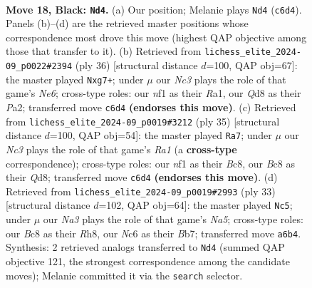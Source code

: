 \documentclass[11pt]{article}
\begin{document}
\begin{figure}[p]
\label{fig:thought-m33}
\end{figure}

\clearpage

\begin{figure}[p]\centering
\begin{subfigure}{0.46\textwidth}\centering
\resizebox{\linewidth}{!}{%
\newchessgame
\chessboard[
  setfen={r1bq1k2/pp3pp1/n1n1p3/1Q1pP3/5P1r/PP6/6PP/R3KNNR b KQ - 0 18},
  showmover=false,
  pgfstyle=straightmove, color=movearrow, markmove={c6-d4}
]}
\caption{}
\end{subfigure}\hfill
\begin{subfigure}{0.46\textwidth}\centering
\resizebox{\linewidth}{!}{%
\newchessgame
\chessboard[
  setfen={1r2k2r/3qp1bp/ppn1N3/2p2p2/4N3/1QPP4/PP4PP/R1B3K1 w k - 0 19},
  showmover=false,
  pgfstyle=straightmove, color=movearrow, markmove={e6-g7}
]}
\caption{}
\end{subfigure}
\\[4pt]
\begin{subfigure}{0.46\textwidth}\centering
\resizebox{\linewidth}{!}{%
\newchessgame
\chessboard[
  setfen={r1bqr1k1/5pp1/pp1p3p/2n5/P1PQP3/R4N1P/5PP1/2B1R1K1 b - - 0 18},
  showmover=false,
  pgfstyle=straightmove, color=movearrow, markmove={a8-a7}
]}
\caption{}
\end{subfigure}\hfill
\begin{subfigure}{0.46\textwidth}\centering
\resizebox{\linewidth}{!}{%
\newchessgame
\chessboard[
  setfen={4k2r/1bq1bppp/p2ppn2/8/nQpNP1P1/4BP2/P1P4P/K2R1B1R b k - 1 17},
  showmover=false,
  pgfstyle=straightmove, color=movearrow, markmove={a4-c5}
]}
\caption{}
\end{subfigure}
\caption{\textbf{Move 18, Black: \texttt{Nd4}.} (a) Our position; Melanie plays \texttt{Nd4} (\texttt{c6d4}). Panels (b)--(d) are the retrieved master positions whose correspondence most drove this move (highest QAP objective among those that transfer to it). (b) Retrieved from \texttt{lichess\_elite\_2024-09\_p0022\#2394} (ply 36) [structural distance $d$=100, QAP obj=67]: the master played \texttt{Nxg7+}; under $\mu$ our \emph{Nc3} plays the role of that game's \emph{Ne6}; cross-type roles: our \emph{n}f1 as their \emph{R}a1, our \emph{Q}d8 as their \emph{P}a2; transferred move \texttt{c6d4} \textbf{(endorses this move)}. (c) Retrieved from \texttt{lichess\_elite\_2024-09\_p0019\#3212} (ply 35) [structural distance $d$=100, QAP obj=54]: the master played \texttt{Ra7}; under $\mu$ our \emph{Nc3} plays the role of that game's \emph{Ra1} (a \textbf{cross-type} correspondence); cross-type roles: our \emph{n}f1 as their \emph{B}c8, our \emph{B}c8 as their \emph{Q}d8; transferred move \texttt{c6d4} \textbf{(endorses this move)}. (d) Retrieved from \texttt{lichess\_elite\_2024-09\_p0019\#2993} (ply 33) [structural distance $d$=102, QAP obj=64]: the master played \texttt{Nc5}; under $\mu$ our \emph{Na3} plays the role of that game's \emph{Na5}; cross-type roles: our \emph{B}c8 as their \emph{R}h8, our \emph{N}c6 as their \emph{B}b7; transferred move \texttt{a6b4}. Synthesis: 2 retrieved analogs transferred to \texttt{Nd4} (summed QAP objective 121, the strongest correspondence among the candidate moves); Melanie committed it via the \texttt{search} selector.}

\end{figure}
\end{document}
